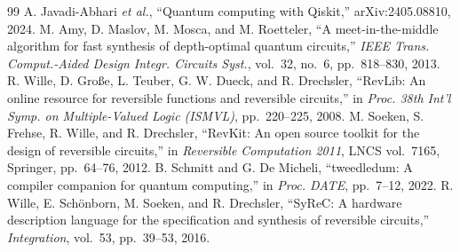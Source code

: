 \documentclass[conference]{IEEEtran}
\theoremstyle{plain}
\begin{document}
\begin{thebibliography}{99}
 A. Javadi-Abhari \emph{et al.}, ``Quantum computing with Qiskit,'' arXiv:2405.08810, 2024.
 M. Amy, D. Maslov, M. Mosca, and M. Roetteler, ``A meet-in-the-middle algorithm for fast synthesis of depth-optimal quantum circuits,'' \emph{IEEE Trans. Comput.-Aided Design Integr. Circuits Syst.}, vol.~32, no.~6, pp.~818--830, 2013.
 R. Wille, D. Gro{\ss}e, L. Teuber, G. W. Dueck, and R. Drechsler, ``RevLib: An online resource for reversible functions and reversible circuits,'' in \emph{Proc. 38th Int'l Symp. on Multiple-Valued Logic (ISMVL)}, pp.~220--225, 2008.
 M. Soeken, S. Frehse, R. Wille, and R. Drechsler, ``RevKit: An open source toolkit for the design of reversible circuits,'' in \emph{Reversible Computation 2011}, LNCS vol.~7165, Springer, pp.~64--76, 2012.
 B. Schmitt and G. De Micheli, ``tweedledum: A compiler companion for quantum computing,'' in \emph{Proc. DATE}, pp.~7--12, 2022.
 R. Wille, E. Sch\"onborn, M. Soeken, and R. Drechsler, ``SyReC: A hardware description language for the specification and synthesis of reversible circuits,'' \emph{Integration}, vol.~53, pp.~39--53, 2016.

\end{thebibliography}
\end{document}
